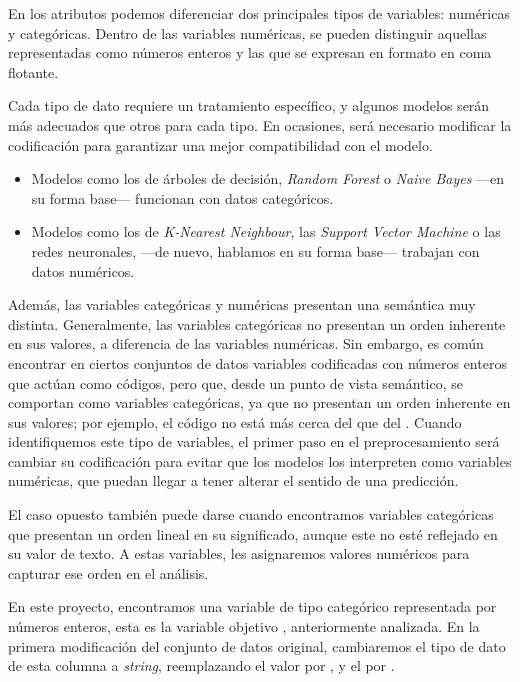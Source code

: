 En los atributos podemos diferenciar dos principales tipos de variables: numéricas y categóricas. 
Dentro de las variables numéricas, se pueden distinguir aquellas representadas como números enteros y las que se expresan en formato en coma flotante.

Cada tipo de dato requiere un tratamiento específico, y algunos modelos serán más adecuados que otros para cada tipo. En ocasiones, será necesario modificar la codificación para garantizar una mejor compatibilidad con el modelo.
\begin{itemize}

    \item Modelos como los de árboles de decisión, \textit{Random Forest} o \textit{Naive Bayes} ---en su forma base--- funcionan con datos categóricos.
    
    \item Modelos como los de \textit{K-Nearest Neighbour}, las \textit{Support Vector Machine} o las redes neuronales, ---de nuevo, hablamos en su forma base--- trabajan con datos numéricos.

\end{itemize}

Además, las variables categóricas y numéricas presentan una semántica muy distinta. Generalmente, las variables categóricas no presentan un orden inherente en sus valores, a diferencia de las variables numéricas. Sin embargo, es común encontrar en ciertos conjuntos de datos variables codificadas con números enteros que actúan como códigos, pero que, desde un punto de vista semántico, se comportan como variables categóricas, ya que no presentan un orden inherente en sus valores; por ejemplo, el código  no está más cerca del  que del . Cuando identifiquemos este tipo de variables, el primer paso en el preprocesamiento será cambiar su codificación para evitar que los modelos los interpreten como variables numéricas, que puedan llegar a tener alterar el sentido de una predicción.

El caso opuesto también puede darse cuando encontramos variables categóricas que presentan un orden lineal en su significado, aunque este no esté reflejado en su valor de texto. A estas variables, les asignaremos valores numéricos para capturar ese orden en el análisis.

En este proyecto, encontramos una variable de tipo categórico representada por números enteros, esta es la variable objetivo , anteriormente analizada. En la primera modificación del conjunto de datos original, cambiaremos el tipo de dato de esta columna a \textit{string}, reemplazando el valor  por , y el  por .

